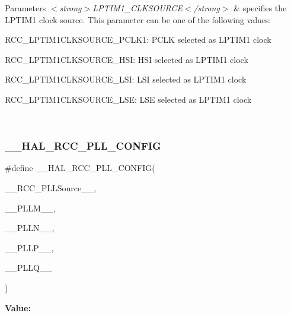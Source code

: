 \begin{DoxyParams}{Parameters}
{\em $<$strong$>$\+L\+P\+T\+I\+M1\+\_\+\+C\+L\+K\+S\+O\+U\+R\+C\+E$<$/strong$>$} & specifies the L\+P\+T\+I\+M1 clock source. This parameter can be one of the following values\+: \begin{DoxyItemize}
\item R\+C\+C\+\_\+\+L\+P\+T\+I\+M1\+C\+L\+K\+S\+O\+U\+R\+C\+E\+\_\+\+P\+C\+L\+K1\+: P\+C\+LK selected as L\+P\+T\+I\+M1 clock \item R\+C\+C\+\_\+\+L\+P\+T\+I\+M1\+C\+L\+K\+S\+O\+U\+R\+C\+E\+\_\+\+H\+SI\+: H\+SI selected as L\+P\+T\+I\+M1 clock \item R\+C\+C\+\_\+\+L\+P\+T\+I\+M1\+C\+L\+K\+S\+O\+U\+R\+C\+E\+\_\+\+L\+SI\+: L\+SI selected as L\+P\+T\+I\+M1 clock \item R\+C\+C\+\_\+\+L\+P\+T\+I\+M1\+C\+L\+K\+S\+O\+U\+R\+C\+E\+\_\+\+L\+SE\+: L\+SE selected as L\+P\+T\+I\+M1 clock \end{DoxyItemize}
\\
\hline
\end{DoxyParams}
\mbox{\label{group___r_c_c_ex___exported___macros_ga56d9ad48b28e7aa4ad3aadca5b4fd431}} 
\subsubsection{\texorpdfstring{\_\_HAL\_RCC\_PLL\_CONFIG}{\_\_HAL\_RCC\_PLL\_CONFIG}}
{\footnotesize\ttfamily \#define \+\_\+\+\_\+\+H\+A\+L\+\_\+\+R\+C\+C\+\_\+\+P\+L\+L\+\_\+\+C\+O\+N\+F\+IG(\begin{DoxyParamCaption}\item[{}]{\+\_\+\+\_\+\+R\+C\+C\+\_\+\+P\+L\+L\+Source\+\_\+\+\_\+,  }\item[{}]{\+\_\+\+\_\+\+P\+L\+L\+M\+\_\+\+\_\+,  }\item[{}]{\+\_\+\+\_\+\+P\+L\+L\+N\+\_\+\+\_\+,  }\item[{}]{\+\_\+\+\_\+\+P\+L\+L\+P\+\_\+\+\_\+,  }\item[{}]{\+\_\+\+\_\+\+P\+L\+L\+Q\+\_\+\+\_\+ }\end{DoxyParamCaption})}

{\bfseries Value\+:}
\begin{DoxyCode}{0}

\end{DoxyCode}


